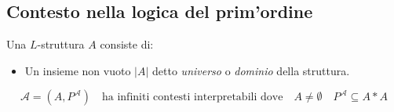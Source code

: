 \documentclass{article}
\begin{document}
\subsection{Contesto nella logica del prim'ordine}
Una $ L$-struttura  $ A $ consiste di:
\begin{itemize}
        \item Un insieme non vuoto $ |A| $ detto \textit{universo} o \textit{dominio} della struttura.
\end{itemize}

 \begin{equation*}
        \mathcal{A} = (A, P^{\mathcal{A}}) \quad  \mbox{ha infiniti contesti interpretabili dove} \quad A \not = \emptyset \quad P^{\mathcal{A}} \subseteq A*A 
\end{equation*}
\end{document}
